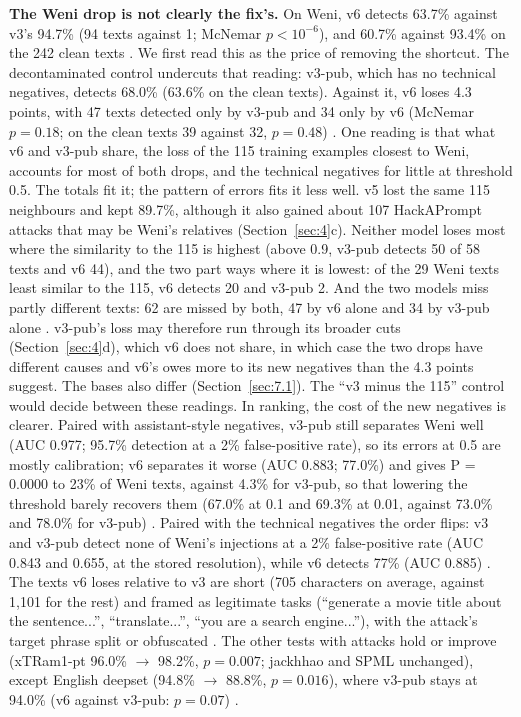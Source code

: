 \documentclass[11pt]{article}
\begin{document}
\textbf{The Weni drop is not clearly the fix's.} On Weni, v6 detects 63.7\% against v3's 94.7\% (94 texts against 1; McNemar $p<10^{-6}$), and 60.7\% against 93.4\% on the 242 clean texts%
. We first read this as the price of removing the shortcut. The decontaminated control undercuts that reading: v3-pub, which has no technical negatives, detects 68.0\% (63.6\% on the clean texts). Against it, v6 loses 4.3 points, with 47 texts detected only by v3-pub and 34 only by v6 (McNemar $p = 0.18$; on the clean texts 39 against 32, $p = 0.48$)%
. One reading is that what v6 and v3-pub share, the loss of the 115 training examples closest to Weni, accounts for most of both drops, and the technical negatives for little at threshold 0.5. The totals fit it; the pattern of errors fits it less well. v5 lost the same 115 neighbours and kept 89.7\%, although it also gained about 107 HackAPrompt attacks that may be Weni's relatives (Section~\ref{sec:4}c). Neither model loses most where the similarity to the 115 is highest (above 0.9, v3-pub detects 50 of 58 texts and v6 44), and the two part ways where it is lowest: of the 29 Weni texts least similar to the 115, v6 detects 20 and v3-pub 2. And the two models miss partly different texts: 62 are missed by both, 47 by v6 alone and 34 by v3-pub alone%
. v3-pub's loss may therefore run through its broader cuts (Section~\ref{sec:4}d), which v6 does not share, in which case the two drops have different causes and v6's owes more to its new negatives than the 4.3 points suggest. The bases also differ (Section~\ref{sec:7.1}). The ``v3 minus the 115'' control would decide between these readings. In ranking, the cost of the new negatives is clearer. Paired with assistant-style negatives, v3-pub still separates Weni well (AUC 0.977; 95.7\% detection at a 2\% false-positive rate), so its errors at 0.5 are mostly calibration; v6 separates it worse (AUC 0.883; 77.0\%) and gives P = 0.0000 to 23\% of Weni texts, against 4.3\% for v3-pub, so that lowering the threshold barely recovers them (67.0\% at 0.1 and 69.3\% at 0.01, against 73.0\% and 78.0\% for v3-pub)%
. Paired with the technical negatives the order flips: v3 and v3-pub detect none of Weni's injections at a 2\% false-positive rate (AUC 0.843 and 0.655, at the stored resolution), while v6 detects 77\% (AUC 0.885)%
. The texts v6 loses relative to v3 are short (705 characters on average, against 1,101 for the rest) and framed as legitimate tasks (``generate a movie title about the sentence...'', ``translate...'', ``you are a search engine...''), with the attack's target phrase split or obfuscated%
. The other tests with attacks hold or improve (xTRam1-pt 96.0\% \ensuremath{\rightarrow} 98.2\%, $p = 0.007$; jackhhao and SPML unchanged), except English deepset (94.8\% \ensuremath{\rightarrow} 88.8\%, $p = 0.016$), where v3-pub stays at 94.0\% (v6 against v3-pub: $p = 0.07$)%
.
\end{document}
